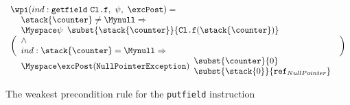 \begin{figure}
$$
\begin{array}{l}
\wpi(ind : \texttt{getfield} \ \texttt{Cl.f}, \ \psi, \ \excPost) = \\
\biggl( 
\begin{array}{l}
   		\stack{\counter} \not= \Mynull\Rightarrow   \\
	\Myspace \psi\begin{array}{l} \subst{\stack{\counter}}{\texttt{Cl.f} (\stack{ \counter}) } \\[0 mm]

		\end{array}\\
   \wedge \\
    ind : \stack{\counter} = \Mynull 	\Rightarrow\\
   \Myspace	 \excPost(\texttt{NullPointerException})
        \begin{array}{l}
          \subst{ \counter }{ 0} \\
          \subst{\stack{0}}{ \texttt{ref}_{NullPointer} }
	\end{array}
    \end{array} \biggr)
\end{array}
 $$
\caption{The weakest precondition rule for the \texttt{putfield} instruction}
\label{fig:wpRule}
\end{figure}




